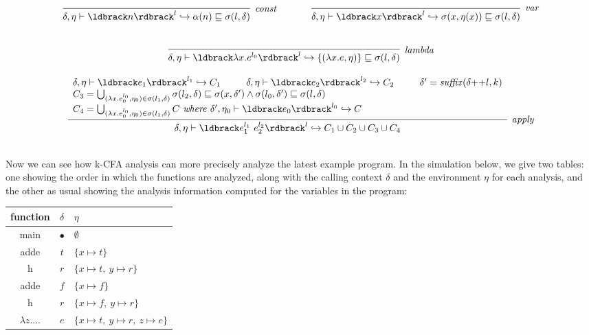 \documentclass[11pt]{article}
\newcommand{\parg}[1] %
  {\ldbrack #1 \rdbrack}
\def\tablespace{\vspace{2ex}}
\newcommand{\alap}{\sqsubseteq}
\begin{document}
\[
\begin{array}{ccc}
\infer[\textit{const}]
	{\delta, \eta \vdash \parg{n}^l \hookrightarrow \alpha(n) \alap \sigma(l, \delta)}
	{} & ~~~~~ &
	
\infer[\textit{var}]
	{\delta, \eta \vdash \parg{x}^l \hookrightarrow \sigma(x, \eta(x)) \alap \sigma(l, \delta)}
	{}\\[3ex]
\end{array}
\]

\[
\begin{array}{c}
\infer[\textit{lambda}]
	{\delta, \eta \vdash \parg{\lambda x . e^{l_0}}^l \hookrightarrow \{(\lambda x . e, \eta)\} \alap \sigma(l, \delta)}
	{}\\[3ex]
	
\infer[\textit{apply}]
	{\delta, \eta \vdash \parg{e_1^{l_1} ~ e_2^{l_2}}^l \hookrightarrow C_1 \cup C_2 \cup C_3 \cup C_4}
	{\begin{array}{l}
		\delta, \eta \vdash \parg{e_1}^{l_1} \hookrightarrow C_1 ~~~~~~~~ \delta, \eta \vdash \parg{e_2}^{l_2} \hookrightarrow C_2 ~~~~~~~~ \delta' = \mathit{suffix}(\delta {+}{+} l, k) \\
		C_3 = \bigcup_{(\lambda x . e_0^{l_0}, \eta_0) \in \sigma(l_1, \delta)}  \sigma(l_2,\delta) \alap \sigma(x,\delta') \land \sigma(l_0,\delta') \alap \sigma(l,\delta) \\
		C_4 = \bigcup_{(\lambda x . e_0^{l_0}, \eta_0) \in \sigma(l_1, \delta)} C ~\mathit{where}~ \delta', \eta_0 \vdash \parg{e_0}^{l_0} \hookrightarrow C
	\end{array}
	}\\[3ex]
	
\end{array}
\]

Now we can see how k-CFA analysis can more precisely analyze the latest example program.  In the simulation below, we give two tables: one showing the order in which the functions are analyzed, along with the calling context $\delta$ and the environment $\eta$ for each analysis, and the other as usual showing the analysis information computed for the variables in the program:




\tablespace
\begin{tabular}{c | c | l}

\textsf{function} & $\delta$ & $\eta$ \\
\hline
main & $\bullet$ & $\emptyset$ \\
adde & $t$       & $\{x \mapsto t\}$ \\
h    & $r$       & $\{x \mapsto t,~ y \mapsto r\}$ \\
adde & $f$       & $\{x \mapsto f\}$ \\
h    & $r$       & $\{x \mapsto f,~ y \mapsto r\}$ \\
$\lambda z ....$ & $e$ & $\{x \mapsto t,~ y \mapsto r,~ z \mapsto e\}$ \\

\end{tabular}
\tablespace
\end{document}
